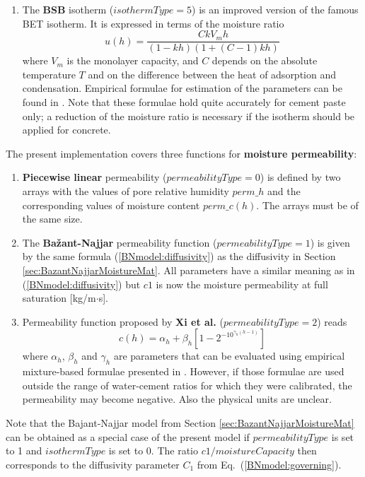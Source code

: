\documentclass[a4paper]{article}
\newcommand{\refeq}[1]{Eq.~(\ref{#1})}
\begin{document}
\begin{enumerate}
\item
The {\bf BSB} isotherm \cite{BSB} ($isothermType=5$) is an improved
version of the famous BET isotherm. It is expressed in terms
of the moisture ratio
\begin{equation}\label{nlisomoisture:BSB}
u(h) = \frac{C k V_m h}{(1-k h)(1+(C-1)k h)}
\end{equation} 
where $V_m$ is the monolayer capacity, and $C$ depends on the absolute
temperature $T$ and on the difference between the heat of adsorption and
condensation. Empirical formulae for estimation of the parameters can
be found in \cite{Xi}. Note that these formulae hold quite accurately
for cement paste only; a reduction of the moisture ratio is necessary 
if the isotherm
should be applied for concrete. 
\end{enumerate}

The present implementation covers three functions for 
{\bf moisture permeability}:
\begin{enumerate}

\item
{\bf Piecewise linear} permeability  ($permeabilityType=0$) 
is defined by two arrays
with the values of pore relative humidity $perm\_h$ and the
corresponding values of moisture content $perm\_c(h)$. The arrays must be of
the same size. 

\item
The {\bf Ba\v{z}ant-Najjar} 
permeability function ($permeabilityType=1$) is given by the same
formula (\ref{BNmodel:diffusivity}) as the diffusivity in 
Section \ref{sec:BazantNajjarMoistureMat}. All parameters have a similar
meaning as in (\ref{BNmodel:diffusivity}) but  $c1$ is now the
moisture permeability at full saturation [kg/m$\cdot$s].

\item
Permeability function proposed by {\bf Xi et al.} \cite{Xi}
($permeabilityType=2$) reads
\begin{equation}\label{nlisomoisture:Xi}
c(h) = \alpha_h + \beta_h \left[ 1 - 2^{-10^{\gamma_h(h-1)}} \right]
\end{equation} 
where $\alpha_h$, $\beta_h$ and $\gamma_h$ are parameters that can be
evaluated using empirical mixture-based formulae presented in \cite{Xi}. 
However, if those formulae are used outside the range of water-cement 
ratios for which they were calibrated, the
permeability may become negative. Also the physical units are unclear.
\end{enumerate}

Note that the Bajant-Najjar 
model from Section \ref{sec:BazantNajjarMoistureMat} 
can be obtained as a special
case of the present model if $permeabilityType$ is set to 1
and $isothermType$ is set to 0. 
The ratio $c1/moistureCapacity$ then corresponds to the diffusivity
parameter $C_1$ from \refeq{BNmodel:governing}.
\end{document}
